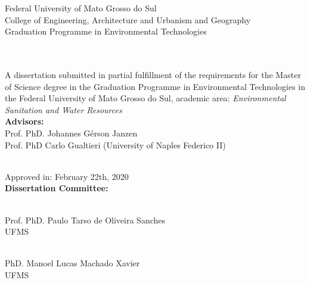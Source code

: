 \begin{center}
    \large Federal University of Mato Grosso do Sul\\
    \large College of Engineering, Architecture and Urbanism and Geography\\
    \large Graduation Programme in Environmental Technologies
    \\[1.5\baselineskip]
    \large\theauthor
    \\[1.5\baselineskip]
    \uppercase{\Large\thetitle}
    \\[1\baselineskip]
\end{center}
\hfill
\begin{minipage}{0.5\textwidth}
A dissertation submitted in partial fulfillment of the requirements for the Master of Science degree in the Graduation Programme in Environmental Technologies in the Federal University of Mato Grosso do Sul, academic area: \textit{Environmental Sanitation and Water Resources}
\\[0.5\baselineskip]
\textbf{Advisors:}\\Prof. PhD. Johannes Gérson Janzen\\
Prof. PhD Carlo Gualtieri (University of Naples Federico II)
\end{minipage}
\\[1\baselineskip]
Approved in: February 22th, 2020
\\[0.5\baselineskip]
\textbf{Dissertation Committee:}
\\[4.5\baselineskip]
\begin{minipage}{0.5\textwidth}
    \begin{center}
    \begin{minipage}{7cm}
        \hrulefill
    \end{minipage}\\
    Prof. PhD. Paulo Tarso de Oliveira Sanches\\
    UFMS
    \end{center}
\end{minipage}
\hfill
\begin{minipage}{0.5\textwidth}
    \begin{center}
    \begin{minipage}{7cm}
        \hrulefill
    \end{minipage}\\
    PhD. Manoel Lucas Machado Xavier\\
    UFMS
    \end{center}
\end{minipage}
\vfill{}
\begin{center}
    \thedate
\end{center}
